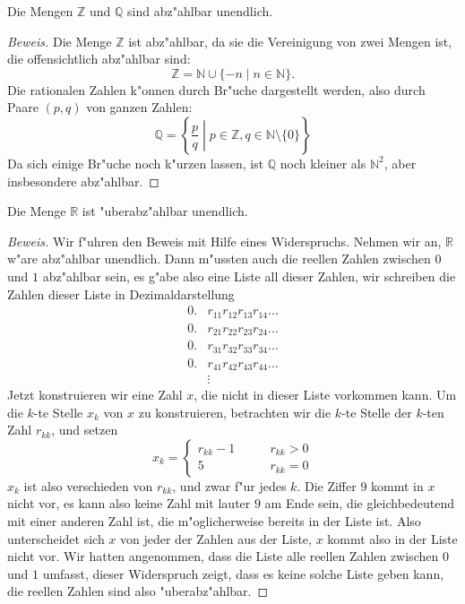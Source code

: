 \begin{satz}
Die Mengen $\mathbb Z$ und $\mathbb Q$ sind abz"ahlbar unendlich.
\end{satz}

\begin{proof}[Beweis]
Die Menge $\mathbb Z$ ist abz"ahlbar, da sie die Vereinigung
von zwei Mengen ist, die offensichtlich abz"ahlbar sind:
\[
\mathbb Z = \mathbb N\cup \{-n\;|\;n\in\mathbb N\}.
\]
Die rationalen Zahlen k"onnen durch Br"uche dargestellt werden,
also durch Paare $(p,q)$ von ganzen Zahlen:
\[
\mathbb Q=\left\{\left.\frac{p}{q}\;\right|\;p\in \mathbb Z,q\in\mathbb N\setminus\{0\}\right\}
\]
Da sich einige Br"uche noch k"urzen lassen, ist $\mathbb Q$ noch
kleiner als $\mathbb N^2$, aber insbesondere abz"ahlbar.
\end{proof}

\begin{satz}
Die Menge $\mathbb R$ ist "uberabz"ahlbar unendlich.
\end{satz}

\begin{proof}[Beweis]
Wir f"uhren den Beweis mit Hilfe eines Widerspruchs. Nehmen wir
an, $\mathbb R$ w"are abz"ahlbar unendlich. Dann m"ussten auch
die reellen Zahlen zwischen $0$ und $1$ abz"ahlbar sein,  es g"abe also eine
Liste all dieser Zahlen, wir schreiben die Zahlen
dieser Liste in Dezimaldarstellung
\begin{align*}
0.&r_{11}r_{12}r_{13}r_{14}\dots\\
0.&r_{21}r_{22}r_{23}r_{24}\dots\\
0.&r_{31}r_{32}r_{33}r_{34}\dots\\
0.&r_{41}r_{42}r_{43}r_{44}\dots\\
&\vdots
\end{align*}
Jetzt konstruieren wir eine Zahl $x$, die nicht in dieser Liste vorkommen
kann. Um die $k$-te Stelle $x_k$ von $x$ zu konstruieren, betrachten
wir die $k$-te Stelle der $k$-ten Zahl $r_{kk}$, und setzen
\[
x_k=\begin{cases}
r_{kk}-1&\qquad r_{kk}>0\\
5&\qquad r_{kk}=0
\end{cases}
\]
$x_k$ ist also verschieden von $r_{kk}$, und zwar f"ur jedes $k$.
Die Ziffer $9$ kommt in $x$ nicht vor, es kann also keine Zahl
mit lauter $9$ am Ende sein, die gleichbedeutend mit einer anderen
Zahl ist, die m"oglicherweise bereits in der Liste ist.
Also unterscheidet sich $x$ von jeder der Zahlen aus der Liste, $x$
kommt also in der Liste nicht vor. Wir hatten angenommen, dass die
Liste alle reellen Zahlen zwischen $0$ und $1$ umfasst, dieser
Widerspruch zeigt, dass es keine solche Liste geben kann, die
reellen Zahlen sind also "uberabz"ahlbar.
\end{proof}

